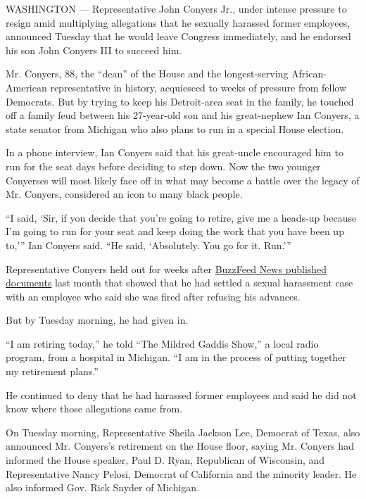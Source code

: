 WASHINGTON --- Representative John Conyers Jr., under intense pressure
to resign amid multiplying allegations that he sexually harassed former
employees, announced Tuesday that he would leave Congress immediately,
and he endorsed his son John Conyers III to succeed him.

Mr. Conyers, 88, the ``dean'' of the House and the longest-serving
African-American representative in history, acquiesced to weeks of
pressure from fellow Democrats. But by trying to keep his Detroit-area
seat in the family, he touched off a family feud between his 27-year-old
son and his great-nephew Ian Conyers, a state senator from Michigan who
also plans to run in a special House election.

In a phone interview, Ian Conyers said that his great-uncle encouraged
him to run for the seat days before deciding to step down. Now the two
younger Conyerses will most likely face off in what may become a battle
over the legacy of Mr. Conyers, considered an icon to many black people.

``I said, `Sir, if you decide that you're going to retire, give me a
heads-up because I'm going to run for your seat and keep doing the work
that you have been up to,''' Ian Conyers said. ``He said, `Absolutely.
You go for it. Run.'''

Representative Conyers held out for weeks after
\href{https://www.buzzfeed.com/paulmcleod/she-complained-that-a-powerful-congressman-harassed-her?utm_term=.mwMaK3pQX\#.tkbdl8BVp}{BuzzFeed
News published documents} last month that showed that he had settled a
sexual harassment case with an employee who said she was fired after
refusing his advances.

But by Tuesday morning, he had given in.

``I am retiring today,'' he told ``The Mildred Gaddis Show,'' a local
radio program, from a hospital in Michigan. ``I am in the process of
putting together my retirement plans.''

He continued to deny that he had harassed former employees and said he
did not know where those allegations came from.

On Tuesday morning, Representative Sheila Jackson Lee, Democrat of
Texas, also announced Mr. Conyers's retirement on the House floor,
saying Mr. Conyers had informed the House speaker, Paul D. Ryan,
Republican of Wisconsin, and Representative Nancy Pelosi, Democrat of
California and the minority leader. He also informed Gov. Rick Snyder of
Michigan.

